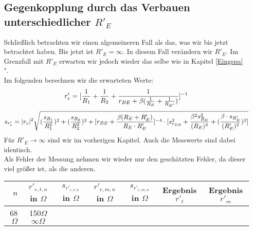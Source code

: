 \subsection{Gegenkopplung durch das Verbauen unterschiedlicher $R'_E$}

Schließlich betrachten wir einen algemeineren Fall als das, was wir bis jetzt betrachtet haben. 
Bis jetzt ist $R'_E = \infty$. In diesem Fall verändern wir $R'_E$. Im Grenzfall mit $R'_E$ erwarten wir 
jedoch wieder das selbe wie in Kapitel \glqq \ref{Eingspa}  ".\\
Im folgenden berechnen wir die erwarteten Werte:\\
\begin{equation*}
    \centering
    r'_e = [\frac{1}{R_1}+\frac{1}{R_2}+\frac{1}{r_{BE}+\beta(\frac{1}{R_E}+\frac{1}{R_{E'}})}]^{-1}
\end{equation*}
\begin{equation*}
    \centering
    s_{r'_e} = |r_e|^2 \sqrt{(\frac{s_{R_1}}{R_1^2})^2+(\frac{s_{R_2}}{R_2^2})^2+[r_{BE}+\frac{\beta(R_E+R'_E)}{R_E \cdot R'_E}]^{-4} \cdot [s_{r_{BR}}^2+\frac{\beta^2 s_{R_E}^2}{(R_{E})^4}+(\frac{\beta \cdot s_{R'_E}}{(R'_{E})^2})^2]}
\end{equation*}
Für $R'_E \to \infty$ sind wir im vorherigen Kapitel. Auch die Messwerte sind dabei identisch.\\
Als Fehler der Messung nehmen wir wieder nur den geschätzten Fehler, da dieser viel größer ist, als die anderen.
\begin{table}[h]
    \centering
    \begin{tabular}{r|c|c|c|c||c||c}
         $n$& $r'_{e,t,n}$ in $\Omega $ & $s_{r'_{e,t,n}}$ in $\Omega $ & $r'_{e,m,n}$ in $\Omega$ & $s_{r'_{e,m,n}}$ in $\Omega $& Ergebnis $r'_t$ & Ergebnis $r'_m$\\
        \hline
        68$\Omega$ &
        150$\Omega$
        $\infty\Omega$
    \end{tabular}
\end{table}